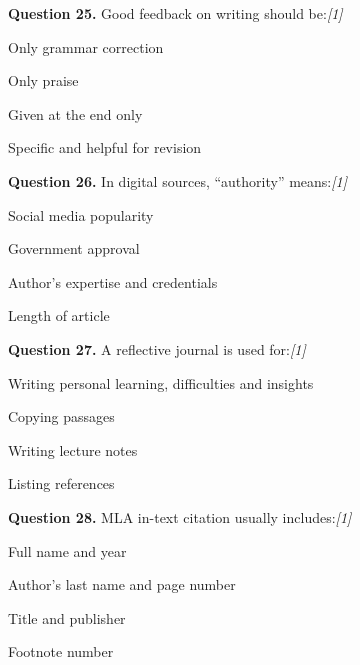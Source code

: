 \documentclass[11pt,a4paper]{article}
\newcommand{\pts}[1]{\hfill   \textit{[#1]}}
\begin{document}
\medskip




\noindent   \textbf{Question 25.} Good feedback on writing should be:\pts{1}

\begin{parts}
  \item Only grammar correction
  \item Only praise
  \item Given at the end only
  \item Specific and helpful for revision
\end{parts}

\medskip




\noindent   \textbf{Question 26.} In digital sources, ``authority'' means:\pts{1}

\begin{parts}
  \item Social media popularity
  \item Government approval
  \item Author's expertise and credentials
  \item Length of article
\end{parts}

\medskip




\noindent   \textbf{Question 27.} A reflective journal is used for:\pts{1}

\begin{parts}
  \item Writing personal learning, difficulties and insights
  \item Copying passages
  \item Writing lecture notes
  \item Listing references
\end{parts}

\medskip




\noindent   \textbf{Question 28.} MLA in-text citation usually includes:\pts{1}

\begin{parts}
  \item Full name and year
  \item Author's last name and page number
  \item Title and publisher
  \item Footnote number
\end{parts}

\medskip
\end{document}
